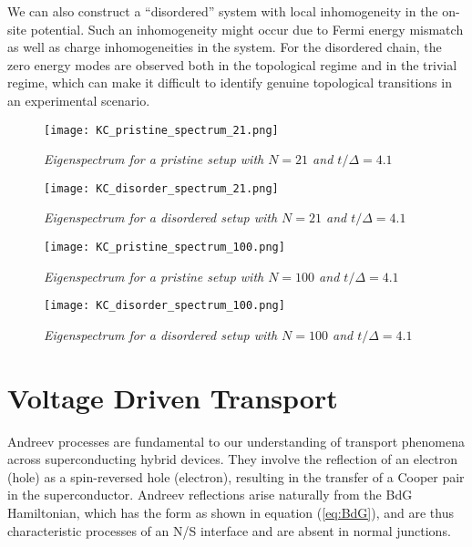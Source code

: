 \vspace{1cm}

We can also construct a ``disordered'' system with local inhomogeneity in the on-site potential. Such an inhomogeneity might occur due to Fermi energy mismatch as well as charge inhomogeneities in the system. For the disordered chain, the zero energy modes are observed both in the topological regime and in the trivial regime, which can make it difficult to identify genuine topological transitions in an experimental scenario.

\clearpage

\vspace*{2cm}

\begin{figure}[!htbp]
\centering
\texttt{[image: KC\_pristine\_spectrum\_21.png]}
\caption{\textit{Eigenspectrum for a pristine setup with $N = 21$ and $t/\Delta = 4.1$}}
\vspace{1cm}
\texttt{[image: KC\_disorder\_spectrum\_21.png]}
\caption{\textit{Eigenspectrum for a disordered setup with $N = 21$ and $t/\Delta = 4.1$}}
\end{figure}    

\clearpage

\vspace*{2cm}

\begin{figure}[!htbp]
\centering
\texttt{[image: KC\_pristine\_spectrum\_100.png]}
\caption{\textit{Eigenspectrum for a pristine setup with $N = 100$ and $t/\Delta = 4.1$}}
\vspace{1cm}
\texttt{[image: KC\_disorder\_spectrum\_100.png]}
\caption{\textit{Eigenspectrum for a disordered setup with $N = 100$ and $t/\Delta = 4.1$}}
\end{figure} 

\clearpage


\section{Voltage Driven Transport}

Andreev processes are fundamental to our understanding of transport phenomena across superconducting hybrid devices. They involve the reflection of an electron (hole) as a spin-reversed hole (electron), resulting in the transfer of a Cooper pair in the superconductor. Andreev reflections arise naturally from the BdG Hamiltonian, which has the form as shown in equation (\ref{eq:BdG}), and are thus characteristic processes of an N/S interface and are absent in normal junctions.

